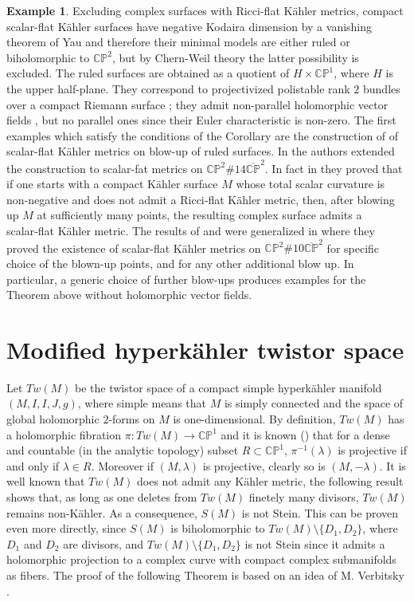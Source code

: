 \documentclass[11pt]{amsart}
\theoremstyle{definition}
\theoremstyle{plain}
\theoremstyle{definition}
\newtheorem{Ex}[Def]{Example}
\theoremstyle{plain}
\theoremstyle{remark}
\theoremstyle{plain}
\newcommand{\numberset}{\mathbb}
\newcommand{\C}{\numberset{C}}
\newcommand{\proj}{\mathbb{P}}
\begin{document}
\begin{Ex} Excluding complex surfaces with Ricci-flat K\"ahler metrics, compact scalar-flat K\"ahler surfaces have negative Kodaira dimension by a vanishing theorem of Yau \cite{Yau} and therefore  their minimal models are either ruled or biholomorphic to ${\mathbb {CP}}^2$, but by Chern-Weil theory  the latter possibility is excluded. 
The ruled surfaces are obtained as a quotient of  $H\times {\mathbb {CP}}^1$,  where $H$ is the upper half-plane.  They correspond to projectivized polistable rank $2$ bundles over a compact  Riemann surface \cite{Barth-Hulek-Peters-Van de Ven}; they admit
non-parallel holomorphic vector fields \cite{R-S}, but no parallel ones since their Euler characteristic is non-zero. The first examples which satisfy the conditions of the Corollary are the construction of  \cite{LeBrun} of scalar-flat K\"ahler metrics on blow-up of ruled surfaces. In  \cite{KLP} the authors extended the construction to scalar-fat metrics on ${\mathbb {CP}}^2\# 14\overline{\mathbb {CP}}^2$. In fact in \cite{KLP} they proved that  if one starts  with a compact K\"ahler surface $M$ whose total scalar curvature is non‑negative and does not admit a Ricci‑flat K\"ahler metric, then, after blowing up 
$M$  at sufficiently many points, the resulting complex surface admits a scalar‑flat K\"ahler metric. The results of \cite{LeBrun} and \cite{KLP} were generalized in \cite{R-S} where they proved the existence of scalar-flat K\"ahler metrics on ${\mathbb {CP}}^2\# 10\overline{\mathbb {CP}}^2$ for specific choice of the blown-up points, and for any other additional blow up. In particular,  a generic choice of further blow-ups produces examples for the Theorem above without holomorphic vector fields. 
\end{Ex}


\section{Modified hyperk\"{a}hler twistor space}\label{modified hyperk}
Let $Tw(M)$ be the twistor space of a compact simple hyperk\"ahler manifold  $(M,I,I,J, g)$,  where  simple means that 
$M$  is simply connected and the space of global holomorphic 2-forms on 
$M$ is one-dimensional. By definition, $Tw(M)$ has a holomorphic fibration $\pi: Tw(M)  \to  \C\proj^1$ and it is known (\cite{Verbitsky}) that for a dense and countable (in the analytic topology) subset $R\subset \C \proj^1$, $\pi^{-1}(\lambda)$ is projective if and only if $\lambda \in R$. Moreover if $(M,\lambda)$ is projective, clearly so is $(M,-\lambda)$. It is well known that $Tw(M)$ does not admit any K\"ahler metric, the following result shows that, as long as one deletes from $Tw(M)$ finetely many divisors, $Tw(M)$ remains non-K\"ahler. As a consequence, $S(M)$ is not Stein. This can be proven even more directly, since $S(M)$ is biholomorphic to $Tw(M)\setminus \{D_1, D_2\}$, where $D_1$ and $D_2$ are divisors, and $Tw(M)\setminus \{D_1, D_2\}$ is not Stein since it admits a holomorphic projection to a complex curve with compact complex submanifolds as fibers. The proof of the following Theorem is based on an idea of M. Verbitsky \cite{Verb2}.
\end{document}
